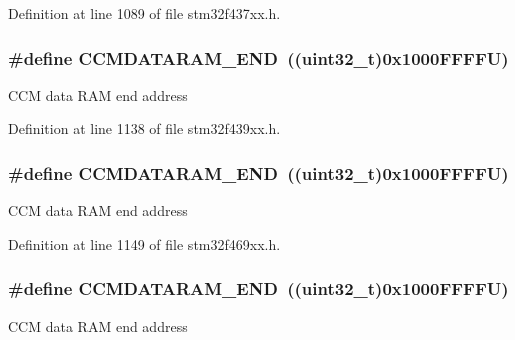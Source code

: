Definition at line 1089 of file stm32f437xx.\+h.

\subsubsection[{\texorpdfstring{C\+C\+M\+D\+A\+T\+A\+R\+A\+M\+\_\+\+E\+ND}{CCMDATARAM_END}}]{\setlength{\rightskip}{0pt plus 5cm}\#define C\+C\+M\+D\+A\+T\+A\+R\+A\+M\+\_\+\+E\+ND~((uint32\+\_\+t)0x1000\+F\+F\+F\+F\+U)}\hypertarget{group___peripheral__memory__map_ga9fbe263946209e6f09faf93512bd2f9a}{}\label{group___peripheral__memory__map_ga9fbe263946209e6f09faf93512bd2f9a}
C\+CM data R\+AM end address 

Definition at line 1138 of file stm32f439xx.\+h.

\subsubsection[{\texorpdfstring{C\+C\+M\+D\+A\+T\+A\+R\+A\+M\+\_\+\+E\+ND}{CCMDATARAM_END}}]{\setlength{\rightskip}{0pt plus 5cm}\#define C\+C\+M\+D\+A\+T\+A\+R\+A\+M\+\_\+\+E\+ND~((uint32\+\_\+t)0x1000\+F\+F\+F\+F\+U)}\hypertarget{group___peripheral__memory__map_ga9fbe263946209e6f09faf93512bd2f9a}{}\label{group___peripheral__memory__map_ga9fbe263946209e6f09faf93512bd2f9a}
C\+CM data R\+AM end address 

Definition at line 1149 of file stm32f469xx.\+h.

\subsubsection[{\texorpdfstring{C\+C\+M\+D\+A\+T\+A\+R\+A\+M\+\_\+\+E\+ND}{CCMDATARAM_END}}]{\setlength{\rightskip}{0pt plus 5cm}\#define C\+C\+M\+D\+A\+T\+A\+R\+A\+M\+\_\+\+E\+ND~((uint32\+\_\+t)0x1000\+F\+F\+F\+F\+U)}\hypertarget{group___peripheral__memory__map_ga9fbe263946209e6f09faf93512bd2f9a}{}\label{group___peripheral__memory__map_ga9fbe263946209e6f09faf93512bd2f9a}
C\+CM data R\+AM end address 

